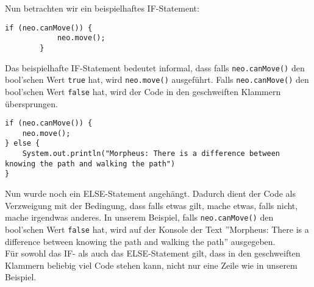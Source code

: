 \begin{Infobox}[IF-Verzweigung]
    Nun betrachten wir ein beispielhaftes IF-Statement:

    \begin{lstlisting}[breaklines=true, numbers=none]
        if (neo.canMove()) {
            neo.move();
        } 
    \end{lstlisting}

    Das beispielhafte IF-Statement bedeutet informal, dass falls \lstinline{neo.canMove()} den bool'schen Wert \lstinline{true} hat, wird \lstinline{neo.move()} ausgeführt. Falls \lstinline{neo.canMove()} den bool'schen Wert \lstinline{false} hat, wird der Code in den geschweiften Klammern übersprungen.

    \begin{lstlisting}[breaklines=true, numbers=none]
if (neo.canMove()) {
    neo.move();
} else {
    System.out.println("Morpheus: There is a difference between knowing the path and walking the path")
}
    \end{lstlisting}

    Nun wurde noch ein ELSE-Statement angehängt. Dadurch dient der Code als Verzweigung mit der Bedingung, dass falls etwas gilt, mache etwas, falls nicht, mache irgendwas anderes. In unserem Beispiel, falls \lstinline{neo.canMove()} den bool'schen Wert \lstinline{false} hat, wird auf der Konsole der Text ''Morpheus: There is a difference between knowing the path and walking the path'' ausgegeben.\\

Für sowohl das IF- als auch das ELSE-Statement gilt, dass in den geschweiften Klammern beliebig viel Code stehen kann, nicht nur eine Zeile wie in unserem Beispiel.
\end{Infobox}


